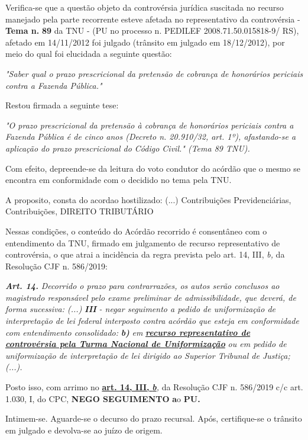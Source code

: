 \documentclass[12pt]{article}
\begin{document}
\justifying
\noindent Verifica-se que a questão objeto da controvérsia jurídica suscitada no recurso manejado pela parte recorrente esteve afetada no representativo da controvérsia - \textbf{Tema n. }\textbf{89} da TNU - (PU no processo n. PEDILEF 2008.71.50.015818-9/ RS),  afetado em 14/11/2012 foi julgado (trânsito em julgado em 18/12/2012), por meio do qual foi elucidada a seguinte questão:

\noindent \textit{"Saber qual o prazo prescricional da pretensão de cobrança de honorários periciais contra a Fazenda Pública."}

\noindent Restou firmada a seguinte tese:

\noindent \textit{"O prazo prescricional da pretensão à cobrança de honorários periciais contra a Fazenda Pública é de cinco anos (Decreto n. 20.910/32, art. 1º), afastando-se a aplicação do prazo prescricional do Código Civil." (Tema 89 TNU).}

\noindent Com efeito, depreende-se da leitura do voto condutor do acórdão que o mesmo se encontra em conformidade com o decidido no  tema pela TNU.

\noindent A proposito, consta do acordao hostilizado: (...) Contribuições Previdenciárias, Contribuições, DIREITO TRIBUTÁRIO

\noindent Nessas condições, o conteúdo do Acórdão recorrido é consentâneo com o entendimento da TNU, firmado em julgamento de recurso representativo de controvérsia, o que atrai a incidência da regra prevista pelo art. 14, III, \textit{b,} da Resolução CJF n. 586/2019:

\noindent \textit{\textbf{Art. 14.}}\textit{ Decorrido o prazo para contrarrazões, os autos serão conclusos ao magistrado responsável pelo exame preliminar de admissibilidade, que deverá, de forma sucessiva: (...) }\textit{\textbf{III }}\textit{- negar seguimento a pedido de uniformização de interpretação de lei federal interposto contra acórdão que esteja em conformidade com entendimento consolidado: }\textit{\textbf{b)}}\textit{ em }\uline{\textit{\textbf{recurso representativo de controvérsia pela Turma Nacional de Uniformização}}}\textit{ ou em pedido de uniformização de interpretação de lei dirigido ao Superior Tribunal de Justiça;(...).}

\noindent Posto isso, com arrimo no \uline{\textbf{art. 14, III, }}\uline{\textit{\textbf{b}}}\textit{,} da Resolução CJF n. 586/2019 c/c art. 1.030, I, do CPC, \textbf{NEGO SEGUIMENTO }\textbf{a}o\textbf{ PU}\textbf{.}

\noindent Intimem-se. Aguarde-se o decurso do prazo recursal. Após, certifique-se o trânsito em julgado e devolva-se ao juízo de origem.
\end{document}
